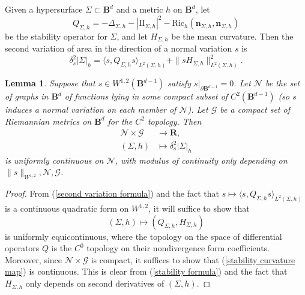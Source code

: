 \documentclass[reqno,11pt]{amsart}
\newcommand{\RR}{\mathbf{R}}
\newcommand{\Ball}{\mathbf{B}}
\newcommand{\Two}{\mathrm{I\!I}}
\newcommand{\normal}{\mathbf n}
\newcommand{\Ric}{\mathrm{Ric}}
\newtheorem{lemma}[theorem]{Lemma}
\theoremstyle{definition}
\numberwithin{equation}{section}
\begin{document}
Given a hypersurface $\Sigma \subset \Ball^d$ and a metric $h$ on $\Ball^d$, let
\begin{equation}\label{stability formula}
Q_{\Sigma, h} = -\Delta_{\Sigma, h} - |\Two_{\Sigma, h}|^2 - \Ric_h(\normal_{\Sigma, h}, \normal_{\Sigma, h})
\end{equation}
be the stability operator for $\Sigma$, and let $H_{\Sigma, h}$ be the mean curvature.
Then the second variation of area in the direction of a normal variation $s$ is \cite[Chapter 1, \S8.1]{colding2011course}
\begin{equation}\label{second variation formula}
\delta^2_s |\Sigma|_h = \langle s, Q_{\Sigma, h} s\rangle_{L^2(\Sigma, h)} + \|sH_{\Sigma, h}\|_{L^2(\Sigma, h)}^2.
\end{equation}

\begin{lemma}\label{uniform continuity of stability}
Suppose that $s \in W^{1, 2}(\Ball^{d - 1})$ satisfy $s|_{\partial \Ball^{d - 1}} = 0$.
Let $\mathscr N$ be the set of graphs in $\Ball^d$ of functions lying in some compact subset of $C^2(\Ball^{d - 1})$ (so $s$ induces a normal variation on each member of $\mathscr N$).
Let $\mathscr G$ be a compact set of Riemannian metrics on $\Ball^d$ for the $C^2$ topology.
Then
\begin{align*}
\mathscr N \times \mathscr G &\to \RR, \\
(\Sigma, h) &\mapsto \delta^2_s |\Sigma|_h
\end{align*}
is uniformly continuous on $\mathscr N$, with modulus of continuity only depending on $\|s\|_{W^{1, 2}}, \mathscr N, \mathscr G$.
\end{lemma}
\begin{proof}
From (\ref{second variation formula}) and the fact that $s \mapsto \langle s, Q_{\Sigma, h} s\rangle_{L^2(\Sigma, h)}$ is a continuous quadratic form on $W^{1, 2}$, it will suffice to show that
\begin{equation}\label{stability curvature map}
(\Sigma, h) \mapsto (Q_{\Sigma, h}, H_{\Sigma, h})
\end{equation}
is uniformly equicontinuous, where the topology on the space of differential operators $Q$ is the $C^0$ topology on their nondivergence form coefficients.
Moreover, since $\mathscr N \times \mathscr G$ is compact, it suffices to show that (\ref{stability curvature map}) is continuous.
This is clear from (\ref{stability formula}) and the fact that $H_{\Sigma, h}$ only depends on second derivatives of $(\Sigma, h)$.
\end{proof}
\end{document}
